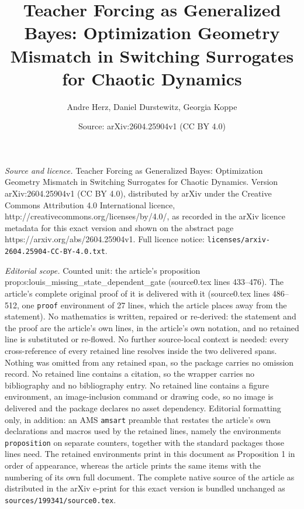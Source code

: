 \documentclass[10pt,a4paper]{amsart}
\title{Teacher Forcing as Generalized Bayes: Optimization Geometry Mismatch in Switching Surrogates for Chaotic Dynamics}
\author{Andre Herz, Daniel Durstewitz, Georgia Koppe}
\date{Source: arXiv:2604.25904v1 (CC BY 4.0)}
\begin{document}
\maketitle

\noindent\emph{Source and licence.} Teacher Forcing as Generalized Bayes: Optimization Geometry Mismatch in Switching Surrogates for Chaotic Dynamics. Version arXiv:2604.25904v1 (CC BY 4.0), distributed by arXiv under the Creative Commons Attribution 4.0 International licence, http://creativecommons.org/licenses/by/4.0/, as recorded in the arXiv licence metadata for this exact version and shown on the abstract page https://arxiv.org/abs/2604.25904v1. Full licence notice: \texttt{licenses/arxiv-2604.25904-CC-BY-4.0.txt}.\par\smallskip

\noindent\textit{Editorial scope.} Counted unit: the article's proposition prop:s:louis\_missing\_state\_dependent\_gate (source0.tex lines 433--476). The article's complete original proof of it is delivered with it (source0.tex lines 486--512, one \texttt{proof} environment of 27 lines, which the article places away from the statement). No mathematics is written, repaired or re-derived: the statement and the proof are the article's own lines, in the article's own notation, and no retained line is substituted or re-flowed.  No further source-local context is needed: every cross-reference of every retained line resolves inside the two delivered spans.  Nothing was omitted from any retained span, so the package carries no omission record.  No retained line contains a citation, so the wrapper carries no bibliography and no bibliography entry.  No retained line contains a figure environment, an image-inclusion command or drawing code, so no image is delivered and the package declares no asset dependency.  Editorial formatting only, in addition: an AMS \texttt{amsart} preamble that restates the article's own declarations and macros used by the retained lines, namely the environments \texttt{proposition} on separate counters, together with the standard packages those lines need.  The retained environments print in this document as Proposition 1 in order of appearance, whereas the article prints the same items with the numbering of its own full document.  The complete native source of the article as distributed in the arXiv e-print for this exact version is bundled unchanged as \texttt{sources/199341/source0.tex}.
\end{document}
